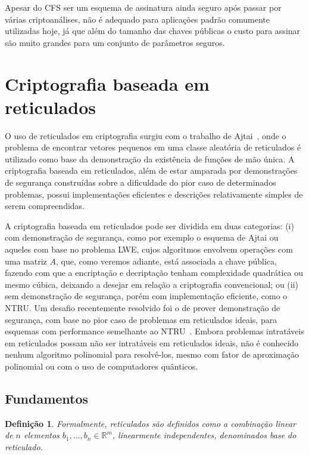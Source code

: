 \documentclass{SBCbookchapter}
\newtheorem{definition}{Definição}{\bfseries}{\itshape}
\begin{document}
\begin{otherlanguage}{brazilian}
Apesar do CFS ser um esquema de assinatura ainda seguro após passar por várias criptoanálises, não é adequado para aplicações padrão comumente utilizadas hoje, já que além do tamanho das chaves públicas o custo para assinar são muito grandes para um conjunto de parâmetros seguros.


\section{Criptografia baseada em reticulados}

O uso de reticulados em criptografia surgiu com o trabalho de Ajtai~\cite{ajtai}, onde o problema de encontrar vetores pequenos em uma classe aleatória de reticulados é utilizado como base da demonstração da existência de funções de mão única. A criptografia baseada em reticulados, além de estar amparada por demonstrações de segurança construídas sobre a dificuldade do pior caso de determinados problemas, possui implementações eficientes e descrições relativamente simples de serem compreendidas.

A criptografia baseada em reticulados pode ser dividida em duas categorias: (i) com demonstração de segurança, como por exemplo o esquema de Ajtai ou aqueles com base no problema LWE, cujos algoritmos envolvem operações com uma matriz $A$, que, como veremos adiante, está associada a chave pública, fazendo com que a encriptação e decriptação tenham complexidade quadrática ou mesmo cúbica, deixando a desejar em relação a criptografia convencional; ou (ii) sem demonstração de segurança, porém com implementação eficiente, como o NTRU. Um desafio recentemente resolvido foi o de prover demonstração de segurança, com base no pior caso de problemas em reticulados ideais, para esquemas com performance semelhante ao NTRU~\cite{Stehle2011}. Embora problemas intratáveis em reticulados possam não ser intratáveis em reticulados ideais, não é conhecido nenhum algoritmo polinomial para resolvê-los, mesmo com fator de aproximação polinomial ou com o uso de computadores quânticos.

\subsection{Fundamentos}

\begin{definition}
Formalmente, reticulados são definidos como a combinação linear de $n$ elementos $b_1, ...,b_n \in \mathbb{R}^m$, linearmente independentes, denominados \textit{base do reticulado}.  


\end{definition}
\end{otherlanguage}
\end{document}
